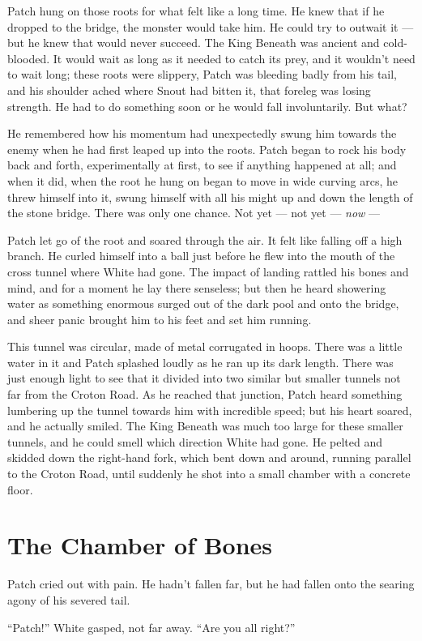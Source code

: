 \documentclass[ebook,oneside,openany,17pt]{memoir}
\renewcommand{\thechapter}{\Roman{chapter}}
\newcounter{sections}
\newcommand{\sections}[1]{%
  \section*{#1}
  \addtocounter{sections}{1}%
  \pdfbookmark[1]{#1}{section.\thechapter.\thesections}}
\begin{document}
Patch hung on those roots for what felt like a long time. He knew that
if he dropped to the bridge, the monster would take him. He could try
to outwait it — but he knew that would never succeed. The King Beneath
was ancient and cold-blooded. It would wait as long as it needed to
catch its prey, and it wouldn’t need to wait long; these roots were
slippery, Patch was bleeding badly from his tail, and his shoulder
ached where Snout had bitten it, that foreleg was losing strength. He
had to do something soon or he would fall involuntarily. But what?

He remembered how his momentum had unexpectedly swung him towards the
enemy when he had first leaped up into the roots. Patch began to rock
his body back and forth, experimentally at first, to see if anything
happened at all; and when it did, when the root he hung on began to
move in wide curving arcs, he threw himself into it, swung himself
with all his might up and down the length of the stone bridge. There
was only one chance. Not yet — not yet — \emph{now} —

Patch let go of the root and soared through the air. It felt like
falling off a high branch. He curled himself into a ball just before
he flew into the mouth of the cross tunnel where White had gone. The
impact of landing rattled his bones and mind, and for a moment he lay
there senseless; but then he heard showering water as something
enormous surged out of the dark pool and onto the bridge, and sheer
panic brought him to his feet and set him running.

This tunnel was circular, made of metal corrugated in hoops. There was
a little water in it and Patch splashed loudly as he ran up its dark
length. There was just enough light to see that it divided into two
similar but smaller tunnels not far from the Croton Road. As he
reached that junction, Patch heard something lumbering up the tunnel
towards him with incredible speed; but his heart soared, and he
actually smiled. The King Beneath was much too large for these smaller
tunnels, and he could smell which direction White had gone. He pelted
and skidded down the right-hand fork, which bent down and around,
running parallel to the Croton Road, until suddenly he shot into a
small chamber with a concrete floor.


\sections{The Chamber of Bones}

Patch cried out with pain. He hadn’t fallen far, but he had fallen
onto the searing agony of his severed tail.

“Patch!” White gasped, not far away. “Are you all right?”
\end{document}
